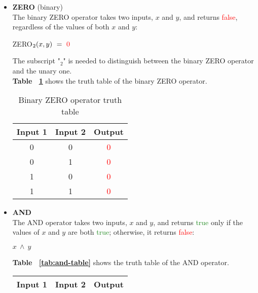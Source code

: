 \documentclass[]{usiinfbachelorproject}
\begin{document}
\begin{itemize}
    \item \textbf{ZERO} (binary)
        \vspace{0.2cm} \\
        The binary ZERO operator takes two inputs, $x$ and $y$, and returns \textcolor{red}{false}, regardless of the values of both $x$ and $y$:
        \begin{center}
            ZERO$_2(x, y) \ =\ \textcolor{red}{0}$
        \end{center}
        The subscript "$_2$" is needed to distinguish between the binary ZERO operator and the unary one. \\
        \textbf{Table ~\ref{tab:zero-table}} shows the truth table of the binary ZERO operator.
        \begin{table}[H]
            \centering
            \begin{tabular}{|c|c|c|}
                \hline
                \textbf{Input 1} & \textbf{Input 2} & \textbf{Output} \\
                \hline
                0 & 0 & \textcolor{red}{0} \\
                \hline
                0 & 1 & \textcolor{red}{0} \\
                \hline
                1 & 0 & \textcolor{red}{0} \\
                \hline
                1 & 1 & \textcolor{red}{0} \\
                \hline
            \end{tabular}
            \caption{Binary ZERO operator truth table}
            \label{tab:zero-table}
        \end{table}
    \item \textbf{AND}
        \vspace{0.2cm} \\
        The AND operator takes two inputs, $x$ and $y$, and returns \textcolor{ForestGreen}{true} only if the values of $x$ and $y$ are both \textcolor{ForestGreen}{true}; otherwise, it returns \textcolor{red}{false}:
        \begin{center}
            $x \ \land \ y$
        \end{center}
        \textbf{Table ~\ref{tab:and-table}} shows the truth table of the AND operator.
        \begin{table}[H]
            \centering
            \begin{tabular}{|c|c|c|}
                \hline
                \textbf{Input 1} & \textbf{Input 2} & \textbf{Output} \\ \hline

\end{tabular}
\end{table}
\end{itemize}
\end{document}
